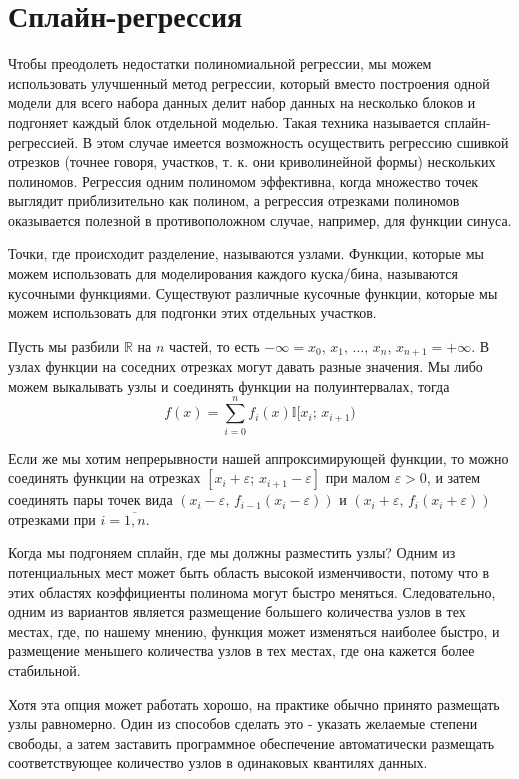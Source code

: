 {\section{Сплайн-регрессия}

Чтобы преодолеть недостатки полиномиальной регрессии, мы можем использовать улучшенный метод регрессии, который вместо построения одной модели для всего набора данных делит набор данных на несколько блоков и подгоняет каждый блок отдельной моделью. Такая техника называется сплайн-регрессией. В этом случае имеется возможность осуществить регрессию сшивкой отрезков (точнее говоря, участков, т. к. они криволинейной формы) нескольких полиномов. Регрессия одним полиномом эффективна, когда множество точек выглядит приблизительно как полином, а регрессия отрезками полиномов оказывается полезной в противоположном случае, например, для функции синуса.

Точки, где происходит разделение, называются узлами. Функции, которые мы можем использовать для моделирования каждого куска/бина, называются кусочными функциями. Существуют различные кусочные функции, которые мы можем использовать для подгонки этих отдельных участков.

Пусть мы разбили $\mathbb{R}$ на $n$ частей, то есть $-\infty=x_0, \,x_1, \, \dots,\, x_{n},\,x_{n+1}=+\infty$. В узлах функции на соседних отрезках могут давать разные значения. Мы либо можем выкалывать узлы и соединять функции на полуинтервалах, тогда $$f(x) = \sum\limits_{i=0}^{n} f_i(x)\mathbb{I}[x_i;\, x_{i+1})$$

Если же мы хотим непрерывности нашей аппроксимирующей функции, то можно соединять функции на отрезках $[x_i+\varepsilon; \, x_{i+1}-\varepsilon]$ при малом $\varepsilon>0$, и затем соединять пары точек вида $(x_i-\varepsilon,\, f_{i-1}(x_i-\varepsilon))$ и $(x_i+\varepsilon,\, f_{i}(x_i+\varepsilon))$ отрезками при $i=\overline{1,n}$.

Когда мы подгоняем сплайн, где мы должны разместить узлы? Одним из потенциальных мест может быть область высокой изменчивости, потому что в этих областях коэффициенты полинома могут быстро меняться. Следовательно, одним из вариантов является размещение большего количества узлов в тех местах, где, по нашему мнению, функция может изменяться наиболее быстро, и размещение меньшего количества узлов в тех местах, где она кажется более стабильной.

Хотя эта опция может работать хорошо, на практике обычно принято размещать узлы равномерно. Один из способов сделать это - указать желаемые степени свободы, а затем заставить программное обеспечение автоматически размещать соответствующее количество узлов в одинаковых квантилях данных.

}
